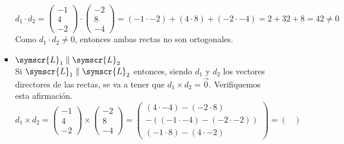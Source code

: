 \documentclass{article}
\def\fancyL{\symscr{L}}
\begin{document}
\begin{enumerate}
\begin{itemize}
\begin{itemize}
                    \[
                        d_1 \cdot d_2 =
                        \begin{pmatrix}
                            -1 \\ 4 \\ -2
                        \end{pmatrix}
                        \cdot
                        \begin{pmatrix}
                            -2 \\ 8 \\ -4
                        \end{pmatrix}
                        =
                        (-1 \cdot -2) + (4 \cdot 8) + (-2 \cdot -4)
                        =
                        2 + 32 + 8
                        =
                        42
                        \neq
                        0
                    \]
                    Como \(d_1 \cdot d_2 \neq 0\), entonces ambas rectas no son ortogonales.
                \item \(\fancyL_1 \parallel \fancyL_2\) \\
                    Si \(\fancyL_1 \parallel \fancyL_2\) entonces, siendo \(d_1\) y \(d_2\) los vectores directores de las rectas, se va a tener que
                    \(d_1 \times d_2 = \vec{0}\). Verifiquemos esta afirmación.
                    \[
                        d_1 \times d_2
                        =
                        \begin{pmatrix}
                            -1 \\ 4 \\ -2
                        \end{pmatrix}
                        \times
                        \begin{pmatrix}
                            -2 \\ 8 \\ -4
                        \end{pmatrix}
                        =
                        \begin{pmatrix}
                            (4 \cdot -4) - (-2 \cdot 8) \\
                            -\left( (-1 \cdot -4) - (-2 \cdot -2) \right) \\
                            (-1 \cdot 8) - (4 \cdot -2)
                        \end{pmatrix}
                        =
                        \begin{pmatrix}

\end{pmatrix}\]
\end{itemize}
\end{itemize}
\end{enumerate}
\end{document}
